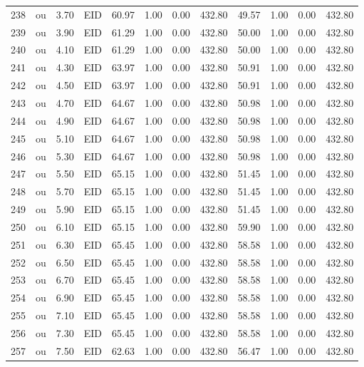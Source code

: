 \begin{table}[ht]
\begin{tabular}{rlrlrrrrrrrr}
  238 & ou & 3.70 & EID & 60.97 & 1.00 & 0.00 & 432.80 & 49.57 & 1.00 & 0.00 & 432.80 \\ 
  239 & ou & 3.90 & EID & 61.29 & 1.00 & 0.00 & 432.80 & 50.00 & 1.00 & 0.00 & 432.80 \\ 
  240 & ou & 4.10 & EID & 61.29 & 1.00 & 0.00 & 432.80 & 50.00 & 1.00 & 0.00 & 432.80 \\ 
  241 & ou & 4.30 & EID & 63.97 & 1.00 & 0.00 & 432.80 & 50.91 & 1.00 & 0.00 & 432.80 \\ 
  242 & ou & 4.50 & EID & 63.97 & 1.00 & 0.00 & 432.80 & 50.91 & 1.00 & 0.00 & 432.80 \\ 
  243 & ou & 4.70 & EID & 64.67 & 1.00 & 0.00 & 432.80 & 50.98 & 1.00 & 0.00 & 432.80 \\ 
  244 & ou & 4.90 & EID & 64.67 & 1.00 & 0.00 & 432.80 & 50.98 & 1.00 & 0.00 & 432.80 \\ 
  245 & ou & 5.10 & EID & 64.67 & 1.00 & 0.00 & 432.80 & 50.98 & 1.00 & 0.00 & 432.80 \\ 
  246 & ou & 5.30 & EID & 64.67 & 1.00 & 0.00 & 432.80 & 50.98 & 1.00 & 0.00 & 432.80 \\ 
  247 & ou & 5.50 & EID & 65.15 & 1.00 & 0.00 & 432.80 & 51.45 & 1.00 & 0.00 & 432.80 \\ 
  248 & ou & 5.70 & EID & 65.15 & 1.00 & 0.00 & 432.80 & 51.45 & 1.00 & 0.00 & 432.80 \\ 
  249 & ou & 5.90 & EID & 65.15 & 1.00 & 0.00 & 432.80 & 51.45 & 1.00 & 0.00 & 432.80 \\ 
  250 & ou & 6.10 & EID & 65.15 & 1.00 & 0.00 & 432.80 & 59.90 & 1.00 & 0.00 & 432.80 \\ 
  251 & ou & 6.30 & EID & 65.45 & 1.00 & 0.00 & 432.80 & 58.58 & 1.00 & 0.00 & 432.80 \\ 
  252 & ou & 6.50 & EID & 65.45 & 1.00 & 0.00 & 432.80 & 58.58 & 1.00 & 0.00 & 432.80 \\ 
  253 & ou & 6.70 & EID & 65.45 & 1.00 & 0.00 & 432.80 & 58.58 & 1.00 & 0.00 & 432.80 \\ 
  254 & ou & 6.90 & EID & 65.45 & 1.00 & 0.00 & 432.80 & 58.58 & 1.00 & 0.00 & 432.80 \\ 
  255 & ou & 7.10 & EID & 65.45 & 1.00 & 0.00 & 432.80 & 58.58 & 1.00 & 0.00 & 432.80 \\ 
  256 & ou & 7.30 & EID & 65.45 & 1.00 & 0.00 & 432.80 & 58.58 & 1.00 & 0.00 & 432.80 \\ 
  257 & ou & 7.50 & EID & 62.63 & 1.00 & 0.00 & 432.80 & 56.47 & 1.00 & 0.00 & 432.80 \\ 

\end{tabular}
\end{table}
